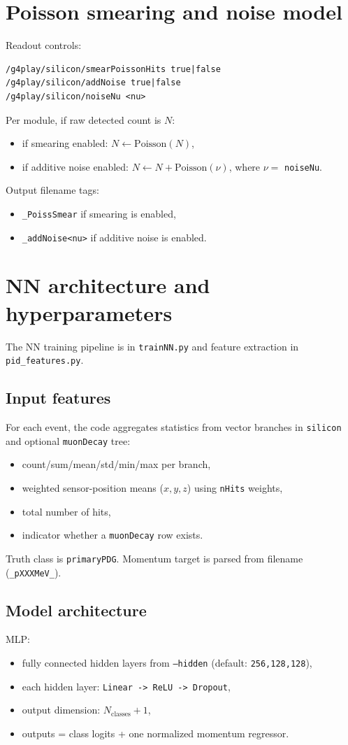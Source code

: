 \documentclass[11pt,a4paper]{article}
\begin{document}
\section{Poisson smearing and noise model}
Readout controls:
\begin{verbatim}
/g4play/silicon/smearPoissonHits true|false
/g4play/silicon/addNoise true|false
/g4play/silicon/noiseNu <nu>
\end{verbatim}

Per module, if raw detected count is \(N\):
\begin{itemize}
  \item if smearing enabled: \(N \leftarrow \mathrm{Poisson}(N)\),
  \item if additive noise enabled: \(N \leftarrow N + \mathrm{Poisson}(\nu)\), where \(\nu=\) \texttt{noiseNu}.
\end{itemize}

Output filename tags:
\begin{itemize}
  \item \texttt{\_PoissSmear} if smearing is enabled,
  \item \texttt{\_addNoise<nu>} if additive noise is enabled.
\end{itemize}

\section{NN architecture and hyperparameters}
The NN training pipeline is in \texttt{trainNN.py} and feature extraction in \texttt{pid\_features.py}.

\subsection{Input features}
For each event, the code aggregates statistics from vector branches in \texttt{silicon} and optional \texttt{muonDecay} tree:
\begin{itemize}
  \item count/sum/mean/std/min/max per branch,
  \item weighted sensor-position means (\(x,y,z\)) using \texttt{nHits} weights,
  \item total number of hits,
  \item indicator whether a \texttt{muonDecay} row exists.
\end{itemize}
Truth class is \texttt{primaryPDG}. Momentum target is parsed from filename (\texttt{\_pXXXMeV\_}).

\subsection{Model architecture}
MLP:
\begin{itemize}
  \item fully connected hidden layers from \texttt{--hidden} (default: \texttt{256,128,128}),
  \item each hidden layer: \texttt{Linear -> ReLU -> Dropout},
  \item output dimension: \(N_{\text{classes}} + 1\),
  \item outputs = class logits + one normalized momentum regressor.
\end{itemize}
\end{document}
